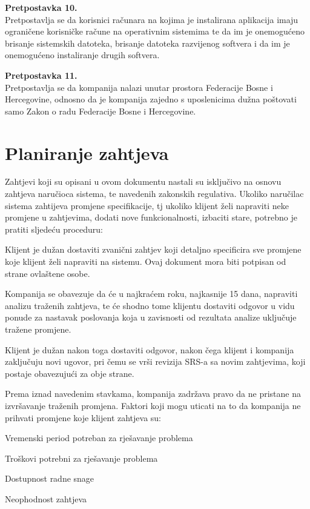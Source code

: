 \documentclass[]{report}
\begin{document}
\noindent
\textbf{Pretpostavka 10.}\\
Pretpostavlja se da korisnici računara na kojima je instalirana aplikacija imaju ograničene korisničke račune na operativnim sistemima te da im je onemogućeno brisanje sistemskih datoteka,  brisanje datoteka razvijenog softvera i da im je onemogućeno instaliranje drugih softvera. 

\noindent
\textbf{Pretpostavka 11. }\\
Pretpostavlja se da kompanija nalazi unutar prostora Federacije Bosne i Hercegovine, odnosno da je kompanija zajedno s uposlenicima dužna poštovati samo Zakon o radu Federacije Bosne i Hercegovine. 
 

\section{Planiranje zahtjeva}

Zahtjevi koji su opisani u ovom dokumentu nastali su isključivo na osnovu zahtjeva  naručioca sistema, te  navedenih zakonskih regulativa.
\noindent
Ukoliko naručilac sistema zahtijeva promjene specifikacije, tj ukoliko klijent želi napraviti neke promjene u zahtjevima, dodati nove funkcionalnosti, izbaciti stare, potrebno je pratiti sljedeću proceduru: 
\begin{compactitem}
\item Klijent je dužan dostaviti zvanični zahtjev koji detaljno specificira sve promjene koje klijent želi napraviti na sistemu.  Ovaj dokument mora biti potpisan od strane ovlaštene osobe. 
\item Kompanija se obavezuje da će u najkraćem roku, najkasnije 15 dana, napraviti analizu traženih zahtjeva, te će shodno tome klijentu dostaviti odgovor u vidu ponude za nastavak poslovanja koja u zavisnosti od rezultata analize uključuje tražene promjene.  
\item Klijent je dužan nakon toga dostaviti odgovor, nakon čega klijent i kompanija zaključuju novi ugovor, pri čemu se vrši revizija  SRS-a sa novim zahtjevima, koji postaje obavezujući za obje strane. 
\end{compactitem}
 \vspace*{0.25cm}
 \noindent
Prema iznad navedenim stavkama, kompanija zadržava pravo da ne pristane na izvršavanje traženih promjena. Faktori koji mogu uticati na to da kompanija ne prihvati promjene koje klijent zahtjeva su: 
\begin{compactitem}
\item Vremenski period potreban za rješavanje problema 
\item Troškovi potrebni za rješavanje problema 
\item Dostupnost radne snage 
\item Neophodnost zahtjeva 
\end{compactitem}
\end{document}
